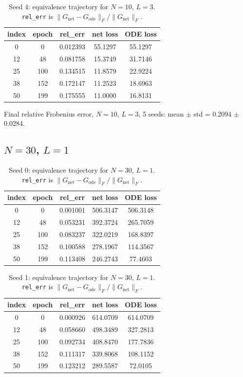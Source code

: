 \begin{table}[H]
\centering
\caption{Seed 4: equivalence trajectory for $N=10$, $L=3$. \texttt{rel\_err} is $\|G_{\mathrm{net}} - G_{\mathrm{ode}}\|_F / \|G_{\mathrm{net}}\|_F$.}
\label{tab:equiv-N10-L3-s4}
\begin{tabular}{c c c c c}
\toprule
index & epoch & rel\_err & net loss & ODE loss \\
\midrule
0 & 0 & 0.012393 & 55.1297 & 55.1297 \\
12 & 48 & 0.081758 & 15.3749 & 31.7146 \\
25 & 100 & 0.134515 & 11.8579 & 22.9224 \\
38 & 152 & 0.172147 & 11.2523 & 18.6963 \\
50 & 199 & 0.175555 & 11.0000 & 16.8131 \\
\bottomrule
\end{tabular}
\end{table}

Final relative Frobenius error, $N=10$, $L=3$, 5 seeds: mean $\pm$ std = 0.2094 $\pm$ 0.0284.

\subsection{$N=30$, $L=1$}
\begin{table}[H]
\centering
\caption{Seed 0: equivalence trajectory for $N=30$, $L=1$. \texttt{rel\_err} is $\|G_{\mathrm{net}} - G_{\mathrm{ode}}\|_F / \|G_{\mathrm{net}}\|_F$.}
\label{tab:equiv-N30-L1-s0}
\begin{tabular}{c c c c c}
\toprule
index & epoch & rel\_err & net loss & ODE loss \\
\midrule
0 & 0 & 0.001001 & 506.3147 & 506.3148 \\
12 & 48 & 0.053231 & 392.3724 & 265.7059 \\
25 & 100 & 0.083237 & 322.0219 & 168.8397 \\
38 & 152 & 0.100588 & 278.1967 & 114.3567 \\
50 & 199 & 0.113408 & 246.2743 & 77.4603 \\
\bottomrule
\end{tabular}
\end{table}

\begin{table}[H]
\centering
\caption{Seed 1: equivalence trajectory for $N=30$, $L=1$. \texttt{rel\_err} is $\|G_{\mathrm{net}} - G_{\mathrm{ode}}\|_F / \|G_{\mathrm{net}}\|_F$.}
\label{tab:equiv-N30-L1-s1}
\begin{tabular}{c c c c c}
\toprule
index & epoch & rel\_err & net loss & ODE loss \\
\midrule
0 & 0 & 0.000926 & 614.0709 & 614.0709 \\
12 & 48 & 0.058660 & 498.3489 & 327.2813 \\
25 & 100 & 0.092734 & 408.8470 & 177.7836 \\
38 & 152 & 0.111317 & 339.8068 & 108.1152 \\
50 & 199 & 0.123212 & 289.5587 & 72.0105 \\
\bottomrule
\end{tabular}
\end{table}

